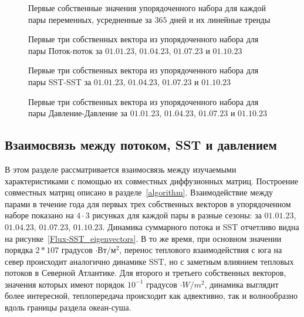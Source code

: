 \begin{figure}
	\caption{Первые собственные значения упорядоченного набора для каждой пары переменных, усредненные за $365$ дней и их линейные тренды}
	\label{eigenvalues_mean_365}
\end{figure}

\begin{figure}
	\caption{Первые три собственных вектора из упорядоченного набора для пары Поток-поток за $01.01.23$, $01.04.23$, $01.07.23$ и $01.10.23$}
	\label{Flux-Flux_eigenvectors}
\end{figure}

\begin{figure}
	\caption{Первые три собственных вектора из упорядоченного набора для пары SST-SST за $01.01.23$, $01.04.23$, $01.07.23$ и $01.10.23$}
	\label{SST-SST_eigenvectors}
\end{figure}

\begin{figure}
	\caption{Первые три собственных вектора из упорядоченного набора для пары Давление-Давление за $01.01.23$, $01.04.23$, $01.07.23$ и $01.10.23$}
	\label{press-press_eigenvectors}
\end{figure}

\subsection{Взаимосвязь между потоком, SST и давлением}
В этом разделе рассматривается взаимосвязь между изучаемыми характеристиками с помощью их совместных диффузионных матриц. Построение совместных матриц описано в разделе~\ref{algorithm}. Взаимодействие между парами в течение года для первых трех собственных векторов в упорядоченном наборе показано на $4 \cdot 3$ рисунках для каждой пары в разные сезоны: за $01.01.23$, $01.04.23$, $01.07.23$, $01.10.23$. Динамика суммарного потока и SST отчетливо видна на рисунке~\ref{Flux-SST_eigenvectors}. В то же время, при основном значении порядка $2*107$ градусов $\cdot Вт/м^2$, перенос теплового взаимодействия с юга на север происходит аналогично динамике SST, но с заметным влиянием тепловых потоков в Северной Атлантике. Для второго и третьего собственных векторов, значения которых имеют порядок $10^{-1}$ градусов $\cdot W/m^2$, динамика выглядит более интересной, теплопередача происходит как адвективно, так и волнообразно вдоль границы раздела океан-суша.

